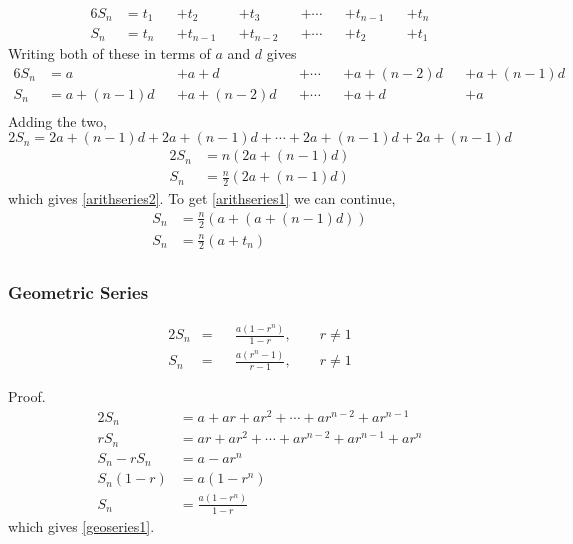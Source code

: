 \documentclass{article}
\numberwithin{equation}{section}
\begin{document}
\begin{alignat*}{6}
	S_n & = t_1 && + t_2     && + t_3     && + \dotsb && + t_{n-1} && + t_n \\
	S_n & = t_n && + t_{n-1} && + t_{n-2} && + \dotsb && + t_2     && + t_1
\end{alignat*}
Writing both of these in terms of $a$ and $d$ gives
\begin{alignat*}{6}
	  S_n & = a        && + a+d      && + \dotsb && + a+(n-2)d && + a  + (n-1)d \\
		S_n & = a+(n-1)d && + a+(n-2)d && + \dotsb && + a+d      && + a \\
\end{alignat*}
Adding the two,
\begin{equation}
	2 S_n = 2a+(n-1)d + 2a+(n-1)d + \dotsb + 2a+(n-1)d + 2a + (n-1)d
\end{equation}
\begin{align*}
	2 S_n & = n(2a + (n-1)d) \\
	S_n & = \frac{n}{2}(2a + (n-1)d)
\end{align*}
which gives \eqref{arithseries2}. To get \eqref{arithseries1} we can continue,
\begin{align*}
	S_n & = \frac{n}{2}(a + (a + (n-1)d)) \\
	S_n & = \frac{n}{2}(a + t_n) \\
\end{align*}

\subsubsection{Geometric Series}

\begin{alignat}{2}
	S_n & = && \frac{a(1-r^n)}{1-r}, \qquad r \ne 1 \label{geoseries1} \\
	S_n & = && \frac{a(r^n - 1)}{r-1}, \qquad r \ne 1 \label{geoseries2} 
\end{alignat}

Proof.
\begin{alignat*}{2}
	S_n & = a + ar + ar^2 + \dotsb + ar^{n-2} + ar^{n-1} \\
	r S_n & = ar + ar^2 + \dotsb + ar^{n-2} + ar^{n-1} + ar^n \\
	S_n - rS_n & = a - ar^n \\
	S_n(1-r) & = a(1-r^n) \\
	S_n & = \frac{a(1-r^n)}{1-r}
\end{alignat*}
which gives \eqref{geoseries1}.
\end{document}
